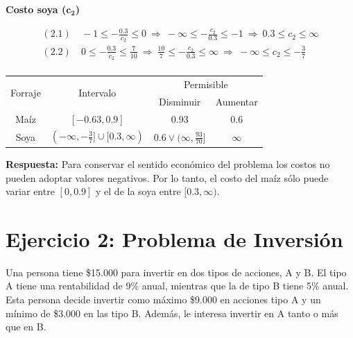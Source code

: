 \documentclass[letterpaper,11pt,oneside]{article}
\begin{document}
\begin{itemize}
	\textbf{Costo soya ($\mathbf{c_{2}}$)}
	
	\begin{equation*}
	\begin{split}
	(2.1)&\ -1 \leq -\frac{0.3}{c_{2}} \leq 0\ \Rightarrow\ -\infty \leq -\frac{c_{2}}{0.3} \leq -1\ \Rightarrow\ 0.3 \leq c_{2} \leq \infty\\
	(2.2)&\ 0 \leq -\frac{0.3}{c_{2}} \leq \frac{7}{10}\ \Rightarrow\ \frac{10}{7} \leq -\frac{c_{2}}{0.3} \leq \infty\ \Rightarrow\ -\infty \leq c_{2} \leq -\frac{3}{7}\\
	\end{split}
	\end{equation*}
	
	\newpage
	\begin{table}[hbt]
		\centering
		\begin{tabular}{c | c | c c}
			\hline\hline
			\multirow{2}{*}{Forraje}& \multirow{2}{*}{Intervalo} &\multicolumn{2}{c}{Permisible}\\
			\cline{3-4}
			& & Disminuir & Aumentar\\
			\hline
			Maíz & $[-0.63,0.9]$ & 0.93 & 0.6\\
			Soya & $(-\infty,-\frac{3}{7}] \cup [0.3,\infty)$ & $0.6 \vee (\infty,\frac{93}{70}]$ & $\infty$\\
			\hline\hline
		\end{tabular}
	\end{table}
	
	\textbf{Respuesta:} Para conservar el sentido económico del problema los costos no pueden adoptar valores negativos. Por lo tanto, el costo del maíz sólo puede variar entre $[0,0.9]$ y el de la soya entre $[0.3,\infty)$.
\end{itemize}

\section*{Ejercicio 2: Problema de Inversión}

Una persona tiene \$15.000 para invertir en dos tipos de acciones, A y B. El tipo A tiene una rentabilidad de 9\% anual, mientras que la de tipo B tiene 5\% anual. Esta persona decide invertir como máximo \$9.000 en acciones tipo A y un mínimo de \$3.000 en las tipo B. Además, le interesa invertir en A tanto o más que en B.
\end{document}
